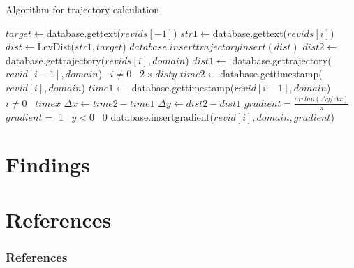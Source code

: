 \documentclass[t]{beamer}
\newcommand{\LineIf}[3]{ {#1}
   \algorithmicif\ {#2}
   \algorithmicelse\ {#3} } %
\begin{document}
  \begin{frame}{Algorithm for trajectory calculation}
      \begin{algorithmic}
        \tiny
        \State $target \gets $database.gettext($revids[-1]$)
        \State $str1 \gets $database.gettext($revids[i]$)
        \State $dist \gets $LevDist($str1, target$)
        \State $database.inserttrajectoryinsert(dist)$    
        \EndIf
        \EndFor
        \State $dist2 \gets $database.gettrajectory($revids[i],domain$)
        \State $dist1 \gets$
        \LineIf{database.gettrajectory($revid[i-1],domain$)}{$i \neq 0$}{$2 \times disty$}
        \State $time2 \gets $database.gettimestamp($revid[i],domain$)
        \State $time1 \gets $
        \LineIf{database.gettimestamp($revid[i-1],domain$)}{$i \neq 0$}{$timex$} 
        \State ${\Delta}x \gets time2 - time1$
        \State ${\Delta}y \gets dist2 - dist1$
        \State $gradient = \frac{arctan({\Delta}y/{\Delta}x)}{\pi}$ 
        \State $gradient = $\LineIf{1}{$y < 0$}{0}
        \EndIf
        \State database.insertgradient($revid[i],domain,gradient$)
        \EndFor
        \EndProcedure
      \end{algorithmic}
  \end{frame}

  \section{Findings}

  \section{References}
  \begin{frame}[allowframebreaks] %
    \frametitle{References}
    \scriptsize{}
  \end{frame}
\end{document}
